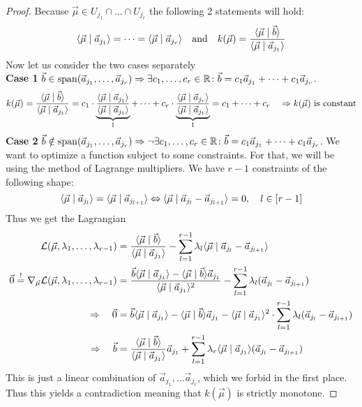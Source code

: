 \begin{proof}
    Because $\vec \mu \in U_{j_1}\cap \dots\cap U_{j_r}$ the following 2 statements will hold:
    $$\langle \vec{\mu} \mid \vec a_{j_1} \rangle = \dots = \langle \vec{\mu} \mid \vec a_{j_r} \rangle \quad\textrm{and}\quad k(\vec\mu) = \frac{\langle \vec \mu \mid \vec b \rangle}{\langle \vec \mu \mid \vec a_{j_1} \rangle}$$
    Now let us consider the two cases separately\\
    \textbf{Case 1} $\vec b \in \operatorname{span}(\vec a_{j_1}, \dots, \vec a_{j_r}) \Rightarrow\exists c_1, \dots, c_r \in \mathbb{R}\colon \vec b = c_1\vec a_{j_1} + \dots + c_1\vec a_{j_r}$.
    $$k(\vec\mu) = \frac{\langle \vec \mu \mid \vec b \rangle}{\langle \vec \mu \mid \vec a_{j_1} \rangle} = c_1 \cdot \underbrace{\frac{\langle \vec \mu \mid \vec a_{j_1} \rangle}{\langle \vec \mu \mid \vec a_{j_1} \rangle}}_1 + \dots + c_r \cdot \underbrace{\frac{\langle \vec \mu \mid \vec a_{j_r} \rangle}{\langle \vec \mu \mid \vec a_{j_1} \rangle}}_1 = c_1 + \dots + c_r \quad \Rightarrow k(\vec\mu)\textrm{ is constant}$$
    \textbf{Case 2} $\vec b \notin \operatorname{span}(\vec a_{j_1}, \dots, \vec a_{j_r}) \Rightarrow\lnot\exists c_1, \dots, c_r \in \mathbb{R}\colon \vec b = c_1\vec a_{j_1} + \dots + c_1\vec a_{j_r}$. We want to optimize a function subject to some constraints. For that, we will be using the method of Lagrange multipliers. We have $r-1$ constraints of the following shape:
    $$\langle \vec\mu \mid \vec a_{j_l} \rangle = \langle \vec\mu \mid \vec a_{j_{l+1}} \rangle \Leftrightarrow \langle \vec\mu \mid \vec a_{j_l} - \vec a_{j_{l+1}} \rangle = 0, \quad l \in [r-1]$$
    Thus we get the Lagrangian
    \begin{align*}
        \mathcal{L}(\vec\mu, \lambda_1, \dots, \lambda_{r-1}) &= \frac{\langle \vec \mu \mid \vec b \rangle}{\langle \vec \mu \mid \vec a_{j_1} \rangle} - \sum_{l=1}^{r-1}\lambda_l \langle \vec\mu \mid \vec a_{j_l} - \vec a_{j_{l+1}} \rangle\\
        \vec0 \stackrel{!}{=}\nabla_{\vec \mu} \mathcal{L}(\vec\mu, \lambda_1, \dots, \lambda_{r-1}) &= \frac{\vec b\langle \vec\mu \mid \vec a_{j_{1}} \rangle - \langle \vec\mu \mid \vec b \rangle\vec a_{j_{1}}}{\langle \vec\mu \mid \vec a_{j_{1}} \rangle^2} - \sum_{l=1}^{r-1}\lambda_l(\vec a_{j_l} - \vec a_{j_{l+1}}) \\
        \Rightarrow\quad \vec0 &= \vec b\langle \vec\mu \mid \vec a_{j_{1}} \rangle - \langle \vec\mu \mid \vec b \rangle\vec a_{j_{1}} - \langle \vec\mu \mid \vec a_{j_{1}} \rangle^2\cdot\sum_{l=1}^{r-1}\lambda_l(\vec a_{j_l} - \vec a_{j_{l+1}})\\
        \Rightarrow\quad \vec b &= \frac{\langle \vec \mu \mid \vec b \rangle}{\langle \vec \mu \mid \vec a_{j_{1}} \rangle}\vec a_{j_{1}} + \sum_{l=1}^{r-1} \lambda_r \langle \vec\mu \mid \vec a_{j_{1}} \rangle(\vec a_{j_l} - \vec a_{j_{l+1}})
    \end{align*}
    This is just a linear combination of $\vec a_{j_1}, \dots \vec a_{j_r}$, which we forbid in the first place. Thus this yields a contradiction meaning that $k(\vec\mu)$ is strictly monotone.
\end{proof}

